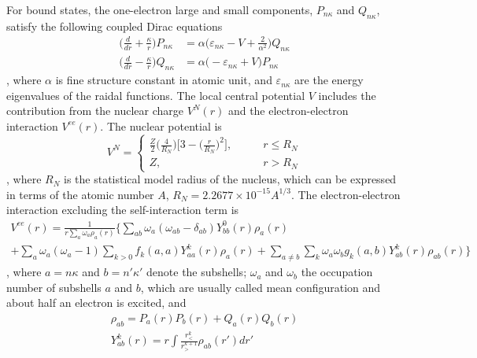 For bound states, the one-electron large and small components,  $P_{n\kappa}$ and $Q_{n\kappa}$, satisfy the following coupled Dirac equations
\begin{equation} \label{eq_dirac_eq}
	\begin{split}
		\Bigg( \frac{d}{dr} + \frac{\kappa}{r} \Bigg) P_{n\kappa} &= \alpha \Bigg( \varepsilon_{n\kappa} - V + \frac{2}{\alpha ^2} \Bigg) Q_{n\kappa} \\
		\Bigg( \frac{d}{dr} - \frac{\kappa}{r} \Bigg) Q_{n\kappa} &= \alpha \Bigg( - \varepsilon_{n\kappa} + V \Bigg) P_{n\kappa}
	\end{split}
\end{equation}
, where $\alpha$ is fine structure constant in atomic unit, and $\varepsilon_{n\kappa}$ are the energy eigenvalues of the raidal functions. The local central potential $V$ includes the contribution from the nuclear charge $V^N(r)$ and the electron-electron interaction $V^{ee}(r)$. The nuclear potential is 
\begin{equation}
	V^N = 
	\begin{cases}
		\frac{Z}{2}\Big(\frac{4}{R_N}\Big)\Big[3-\Big(\frac{r}{R_N}\Big)^2\Big], \qquad & r \leq R_N \\
		Z, & r > R_N
	\end{cases}
\end{equation}
, where $R_N$ is the statistical model radius of the nucleus, which can be expressed in terms of the atomic number $A$, $R_N = 2.2677\times10^{-15}A^{1/3}$. The electron-electron interaction excluding the self-interaction term is 
\begin{multline}
	V^{ee}(r) = \frac{1}{r\sum_a\omega _a\rho _a(r)} \Bigg\{ \sum_{ab} \omega_a(\omega_{ab}-\delta_{ab})Y_{bb}^0(r) \rho_a(r) \\+ \sum_a \omega_a(\omega_a-1)\sum_{k>0} f_k(a, a) Y_{aa}^k(r)\rho_a(r) + \sum_{a \neq b} \sum_k \omega_a \omega_b g_k(a, b)Y_{ab}^k(r) \rho_{ab}(r) \Bigg\}
\end{multline}
, where $a=n\kappa$ and $b=n'\kappa'$ denote the subshells; $\omega_a$ and $\omega_b$ the occupation number of subshells $a$ and $b$, which are usually called mean configuration and about half an electron is excited, and 
\begin{equation}
	\begin{split}
		\rho_{ab} = P_a(r) P_b(r) + Q_a(r) Q_b(r) \\
		Y_{ab}^k(r) = r \int \frac{r_<^k}{r_>^{k+1}} \rho_{ab} (r') dr'
	\end{split}
\end{equation}
